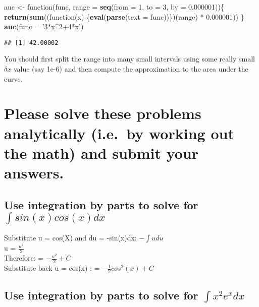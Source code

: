 \documentclass[]{article}
\newenvironment{Shaded}{\begin{snugshade}}{\end{snugshade}}
\newcommand{\KeywordTok}[1]{\textcolor[rgb]{0.13,0.29,0.53}{\textbf{{#1}}}}
\newcommand{\DataTypeTok}[1]{\textcolor[rgb]{0.13,0.29,0.53}{{#1}}}
\newcommand{\DecValTok}[1]{\textcolor[rgb]{0.00,0.00,0.81}{{#1}}}
\newcommand{\FloatTok}[1]{\textcolor[rgb]{0.00,0.00,0.81}{{#1}}}
\newcommand{\StringTok}[1]{\textcolor[rgb]{0.31,0.60,0.02}{{#1}}}
\newcommand{\NormalTok}[1]{{#1}}
\begin{document}
\begin{Shaded}
\begin{Highlighting}[]
\NormalTok{auc <-}\StringTok{ }\NormalTok{function(func, }\DataTypeTok{range =} \KeywordTok{seq}\NormalTok{(}\DataTypeTok{from =} \DecValTok{1}\NormalTok{, }\DataTypeTok{to =} \DecValTok{3}\NormalTok{, }\DataTypeTok{by =} \FloatTok{0.000001}\NormalTok{))\{}
        \KeywordTok{return}\NormalTok{(}\KeywordTok{sum}\NormalTok{((function(x) \{}\KeywordTok{eval}\NormalTok{(}\KeywordTok{parse}\NormalTok{(}\DataTypeTok{text =} \NormalTok{func))\})(range) *}\StringTok{ }\FloatTok{0.000001}\NormalTok{))}
       \NormalTok{\}}
\KeywordTok{auc}\NormalTok{(}\DataTypeTok{func =} \StringTok{'3*x^2+4*x'}\NormalTok{)}
\end{Highlighting}
\end{Shaded}

\begin{verbatim}
## [1] 42.00002
\end{verbatim}

You should first split the range into many small intervals using some
really small \(\delta x\) value (say 1e-6) and then compute the
approximation to the area under the curve.

\section{Please solve these problems analytically (i.e.~by working out
the math) and submit your
answers.}\label{please-solve-these-problems-analytically-i.e.by-working-out-the-math-and-submit-your-answers.}

\subsection{\texorpdfstring{Use integration by parts to solve for
\(\int sin(x)cos(x)dx\)}{Use integration by parts to solve for \textbackslash{}int sin(x)cos(x)dx}}\label{use-integration-by-parts-to-solve-for-int-sinxcosxdx}

Substitute u = cos(X) and du = -sin(x)dx: \(-\int udu\)\\
u = \(\frac{u^2}{2}\)\\
Therefore: = \(-\frac{u^2}{2} + C\)\\
Substitute back u = cos(x) : = \(-\frac{1}{2}cos^2(x) + C\)

\subsection{\texorpdfstring{Use integration by parts to solve for
\(\int x^2e^xdx\)}{Use integration by parts to solve for \textbackslash{}int x\^{}2e\^{}xdx}}\label{use-integration-by-parts-to-solve-for-int-x2exdx}
\end{document}
